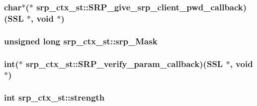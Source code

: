 \hypertarget{structsrp__ctx__st_aa5afa00b70e212481117beb4ab42eb97}{
\subsubsection[{S\-R\-P\-\_\-give\-\_\-srp\-\_\-client\-\_\-pwd\-\_\-callback}]{\setlength{\rightskip}{0pt plus 5cm}char$\ast$($\ast$ srp\-\_\-ctx\-\_\-st\-::\-S\-R\-P\-\_\-give\-\_\-srp\-\_\-client\-\_\-pwd\-\_\-callback)(S\-S\-L $\ast$, void $\ast$)}}\label{structsrp__ctx__st_aa5afa00b70e212481117beb4ab42eb97}
\hypertarget{structsrp__ctx__st_a64b3466f134d404daadf0abf37589097}{
\subsubsection[{srp\-\_\-\-Mask}]{\setlength{\rightskip}{0pt plus 5cm}unsigned long srp\-\_\-ctx\-\_\-st\-::srp\-\_\-\-Mask}}\label{structsrp__ctx__st_a64b3466f134d404daadf0abf37589097}
\hypertarget{structsrp__ctx__st_ae0c484c42a31b5706d95413b75065780}{
\subsubsection[{S\-R\-P\-\_\-verify\-\_\-param\-\_\-callback}]{\setlength{\rightskip}{0pt plus 5cm}int($\ast$ srp\-\_\-ctx\-\_\-st\-::\-S\-R\-P\-\_\-verify\-\_\-param\-\_\-callback)(S\-S\-L $\ast$, void $\ast$)}}\label{structsrp__ctx__st_ae0c484c42a31b5706d95413b75065780}
\hypertarget{structsrp__ctx__st_a7c4b3e2077d11a9ad4b45424bc098148}{
\subsubsection[{strength}]{\setlength{\rightskip}{0pt plus 5cm}int srp\-\_\-ctx\-\_\-st\-::strength}}\label{structsrp__ctx__st_a7c4b3e2077d11a9ad4b45424bc098148}
